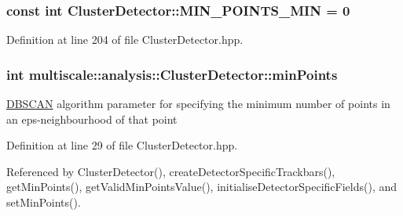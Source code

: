 \hypertarget{classmultiscale_1_1analysis_1_1ClusterDetector_aa0219df3977a845e46be090e6c3f90ad}{
\subsubsection[{\-M\-I\-N\-\_\-\-P\-O\-I\-N\-T\-S\-\_\-\-M\-I\-N}]{\setlength{\rightskip}{0pt plus 5cm}const int {\bf \-Cluster\-Detector\-::\-M\-I\-N\-\_\-\-P\-O\-I\-N\-T\-S\-\_\-\-M\-I\-N} = 0}}\label{classmultiscale_1_1analysis_1_1ClusterDetector_aa0219df3977a845e46be090e6c3f90ad}


\-Definition at line 204 of file \-Cluster\-Detector.\-hpp.

\hypertarget{classmultiscale_1_1analysis_1_1ClusterDetector_aa94df1adc462be5931ec25ba24122fe9}{
\subsubsection[{min\-Points}]{\setlength{\rightskip}{0pt plus 5cm}int {\bf multiscale\-::analysis\-::\-Cluster\-Detector\-::min\-Points}}}\label{classmultiscale_1_1analysis_1_1ClusterDetector_aa94df1adc462be5931ec25ba24122fe9}
\hyperlink{classmultiscale_1_1analysis_1_1DBSCAN}{\-D\-B\-S\-C\-A\-N} algorithm parameter for specifying the minimum number of points in an eps-\/neighbourhood of that point 

\-Definition at line 29 of file \-Cluster\-Detector.\-hpp.



\-Referenced by \-Cluster\-Detector(), create\-Detector\-Specific\-Trackbars(), get\-Min\-Points(), get\-Valid\-Min\-Points\-Value(), initialise\-Detector\-Specific\-Fields(), and set\-Min\-Points().

